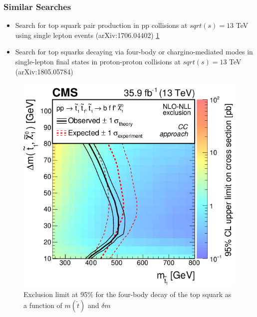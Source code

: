 \documentclass{beamer}
\begin{document}
\begin{frame}
\frametitle{Similar Searches}
{\footnotesize
\begin{itemize}
	\item Search for top squark pair production in pp collisions at $sqrt(s) = 13$ TeV using single lepton events (arXiv:1706.04402) \ref{04402}
	\item Search for top squarks decaying via four-body or chargino-mediated modes in single-lepton final states in proton-proton collisions at $sqrt(s) = 13$ TeV (arXiv:1805.05784)
	
\end{itemize}
}
\begin{figure}
	\centering
	\includegraphics[scale=0.2]{pictures/Figure_007-a} 
	\caption{{\scriptsize 	Exclusion limit at 95\% for the four-body decay of the top squark as a function of $m(\tilde{t})$ and $\delta m$ } }
	\label{04402}
\end{figure}

\end{frame}



\end{document}
